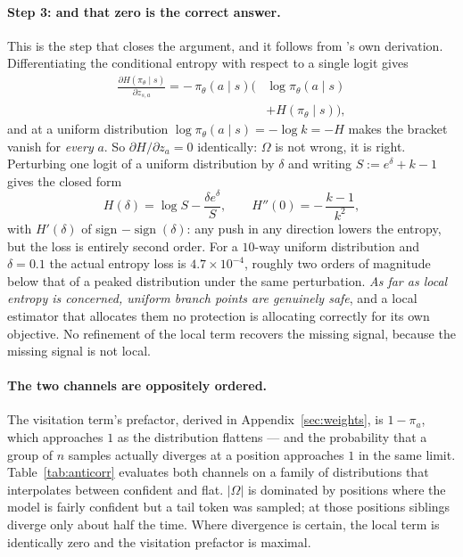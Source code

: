 \documentclass[11pt]{article}
\newcommand{\Om}{\Omega}
\newcommand{\pit}{\pi_{\theta}}
\begin{document}
\paragraph{Step 3: and that zero is the correct answer.}
This is the step that closes the argument, and it follows from
\citeauthor{steer}'s own derivation. Differentiating the conditional entropy with
respect to a single logit gives \citep[Eq.~20]{steer}
%
\begin{equation}
\begin{split}
\frac{\partial H(\pit \mid s)}{\partial z_{s,a}}
= -\,\pit(a \mid s)\bigl(&\log \pit(a \mid s)\\[-2pt]
  &+ H(\pit \mid s)\bigr),
\end{split}
\label{eq:dHdz}
\end{equation}
%
and at a uniform distribution $\log \pit(a \mid s) = -\log k = -H$ makes the bracket
vanish for \emph{every} $a$. So $\partial H / \partial z_a = 0$ identically: $\Om$
is not wrong, it is right. Perturbing one logit of a uniform distribution by $\delta$ and writing
$S := e^{\delta} + k - 1$ gives the closed form
%
\begin{equation}
H(\delta) = \log S - \frac{\delta e^{\delta}}{S},
\qquad
H''(0) = -\,\frac{k-1}{k^{2}},
\label{eq:secondorder}
\end{equation}
%
with $H'(\delta)$ of sign $-\operatorname{sign}(\delta)$: any push in any direction
lowers the entropy, but the loss is entirely second order. For a $10$-way uniform
distribution and $\delta = 0.1$ the actual entropy loss is $4.7\times10^{-4}$,
roughly two orders of magnitude below that of a peaked distribution under the same
perturbation. \emph{As far as local entropy is concerned, uniform branch points are
genuinely safe}, and a local estimator that allocates them no protection is
allocating correctly for its own objective. No refinement of the local term
recovers the missing signal, because the missing signal is not local.

\paragraph{The two channels are oppositely ordered.}
The visitation term's prefactor, derived in Appendix~\ref{sec:weights}, is
$1 - \pi_a$, which approaches $1$ as the distribution flattens --- and the
probability that a group of $n$ samples actually diverges at a position approaches
$1$ in the same limit. Table~\ref{tab:anticorr} evaluates both channels on a family
of distributions that interpolates between confident and flat. $|\Om|$ is dominated
by positions where the model is fairly confident but a tail token was sampled; at
those positions siblings diverge only about half the time. Where divergence is
certain, the local term is identically zero and the visitation prefactor is maximal.
\end{document}

